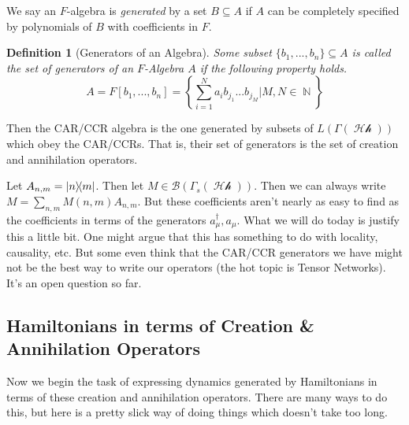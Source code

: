 \documentclass{article}
\DeclareMathOperator{\Hh}{\mathcal{Hh}}
\DeclareMathOperator{\NN}{\mathbb{N}}
\newtheorem{defn}{Definition}
\begin{document}
We say an $F$-algebra is \textit{generated} by a set $B \subseteq A$ if $A$ can be completely specified by polynomials of $B$ with coefficients in $F$.

\begin{defn}[Generators of an Algebra] Some subset $\{b_1,...,b_n\}\subseteq A$ is called the set of generators of an $F$-Algebra $A$ if the following property holds.
\begin{equation}
A = F[b_1,...,b_n] = \left\{\sum_{i=1}^N a_i b_{j_1}...b_{j_M} | M, N \in \NN\right\}
\end{equation}
\end{defn}

Then the CAR/CCR algebra is the one generated by subsets of $L(\Gamma(\Hh))$ which obey the CAR/CCRs. That is, their set of generators is the set of creation and annihilation operators.

Let $A_{n,m} = \dyad{n}{m}$. Then let $M \in \mathcal{B}(\Gamma_s(\Hh))$. Then we can always write $M = \sum_{n,m} M(n,m) A_{n,m}$. But these coefficients aren't nearly as easy to find as the coefficients in terms of the generators $a_\mu^\dagger, a_\mu$. What we will do today is justify this a little bit. One might argue that this has something to do with locality, causality, etc. But some even think that the CAR/CCR generators we have might not be the best way to write our operators (the hot topic is Tensor Networks). It's an open question so far.

\subsection{Hamiltonians in terms of Creation \& Annihilation Operators}
Now we begin the task of expressing dynamics generated by Hamiltonians in terms of these creation and annihilation operators. There are many ways to do this, but here is a pretty slick way of doing things which doesn't take too long.
\end{document}
